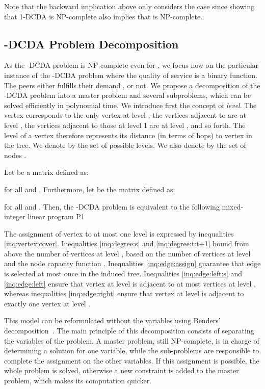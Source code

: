 Note that the backward implication above only considers the case  since showing that 1-DCDA is NP-complete also implies that 
is NP-complete.





\subsection{-DCDA Problem Decomposition}

As the -DCDA problem is NP-complete even for , we focus now on
the particular instance of the -DCDA problem where the quality of
service is a binary function. The peers either fulfills their demand
, or not. We propose a decomposition of
the -DCDA problem into a master problem and several subproblems,
which can be solved efficiently in polynomial time. We introduce first
the concept of \emph{level}. The vertex  corresponds to the only
vertex at level ; the vertices adjacent to  are at level ,
the vertices adjacent to those at level 1 are at level , and so
forth.  The level of a vertex therefore represents its distance (in
terms of hops) to vertex  in the tree. We denote by  the set of possible levels. We also denote by
 the set of nodes .

Let  be a matrix defined as:

for all  and .  Furthermore, let  be the matrix defined as:

for all  and .  Then, the -DCDA problem is equivalent to
the following mixed-integer linear program P1

\vspace{-0.25cm}


The assignment of vertex  to at most one level is expressed
by inequalities \eqref{inq:vertex:cover}. Inequalities
\eqref{inq:degree:s} and \eqref{inq:degree:t:t+1} bound from above the
number of vertices at level , based on the number of vertices at
level  and the node capacity function .  Inequalities
\eqref{inq:edge:assign} guarantee that edge  is selected at
most once in the induced tree.  Inequalities \eqref{inq:edge:left:s}
and \eqref{inq:edge:left} ensure that vertex  at level  is
adjacent to at most  vertices at level , whereas
inequalities \eqref{inq:edge:right} ensure that vertex  at
level  is adjacent to exactly one vertex at level .

This model can be reformulated without the  variables using
Benders' decomposition~\cite{benders1962pps}.  The main principle of
this decomposition consists of separating the variables of the
problem. A master problem, still NP-complete, is in charge of
determining a solution for one variable, while the sub-problems are
responsible to complete the assignment on the other variables. If this
assignment is possible, the whole problem is solved, otherwise a new
constraint is added to the master problem, which makes its computation
quicker.

